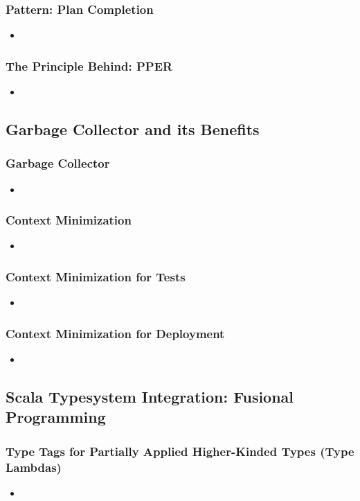 \documentclass[usenames,dvipsnames]{beamer}
\begin{document}
\begin{frame}
\frametitle{Pattern: Plan Completion}
\begin{itemize}
\item 
\end{itemize}
\end{frame}

\begin{frame}
\frametitle{The Principle Behind: PPER}
\begin{itemize}
\item 
\end{itemize}
\end{frame}

\subsection{Garbage Collector and its Benefits}

\begin{frame}
\frametitle{Garbage Collector}
\begin{itemize}
\item 
\end{itemize}
\end{frame}

\begin{frame}
\frametitle{Context Minimization}
\begin{itemize}
\item 
\end{itemize}
\end{frame}

\begin{frame}
\frametitle{Context Minimization for Tests}
\begin{itemize}
\item 
\end{itemize}
\end{frame}

\begin{frame}
\frametitle{Context Minimization for Deployment}
\begin{itemize}
\item 
\end{itemize}
\end{frame}

\subsection{Scala Typesystem Integration: Fusional Programming}

\begin{frame}
\frametitle{Type Tags for Partially Applied Higher-Kinded Types (Type Lambdas)}
\begin{itemize}
\item 
\end{itemize}
\end{frame}
\end{document}
